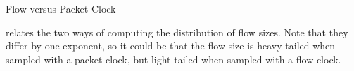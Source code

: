 \begin{ex}{Flow versus Packet Clock \cite{shaikh1999lsr}}
%
%
%
\label{ex-flows}
 \end{ex}
 relates the two ways of computing the distribution
of flow sizes. Note that they differ by one exponent, so it could be
that the flow size is heavy tailed when sampled with a packet clock,
but light tailed when sampled with a flow clock.

